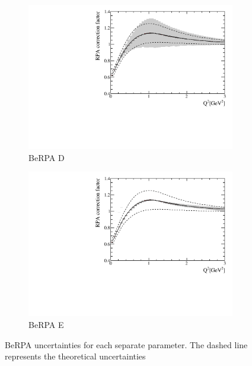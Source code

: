 \begin{figure}[h]
	\begin{subfigure}[t]{0.42\textwidth}
		\includegraphics[width=\textwidth, trim={0mm 0mm 0mm 0mm}, clip,page=1]{figures/niwg/erpa_15percentD_throws}
		\caption{BeRPA D}
	\end{subfigure}
	\begin{subfigure}[t]{0.42\textwidth}
		\includegraphics[width=\textwidth, trim={0mm 0mm 0mm 0mm}, clip,page=1]{figures/niwg/erpa_40percentE_throws}
		\caption{BeRPA E}
	\end{subfigure}
	\caption{BeRPA uncertainties for each separate parameter. The dashed line represents the theoretical uncertainties}
	\label{fig:berpa_throws}
\end{figure}

